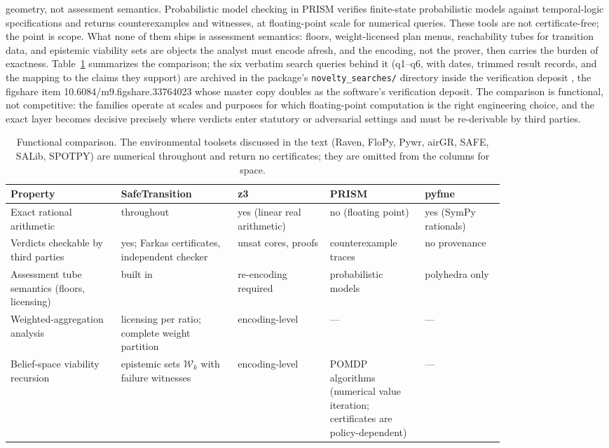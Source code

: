 \documentclass[11pt]{article}
\begin{document}
geometry, not assessment semantics. Probabilistic
model checking in PRISM \citep{Kwiatkowska2011} verifies finite-state
probabilistic models against temporal-logic specifications and returns
counterexamples and witnesses, at floating-point scale for numerical
queries. These tools are not certificate-free; the point is scope. What
none of them ships is
assessment semantics: floors, weight-licensed plan menus, reachability tubes
for transition data, and epistemic viability sets are objects the analyst
must encode afresh, and the encoding, not the prover, then carries the
burden of exactness. Table~\ref{tab:compare} summarizes the comparison; the
six verbatim search queries behind it (q1--q6, with dates, trimmed
result records, and the mapping to the claims they support) are archived
in the package's \texttt{novelty\_searches/} directory inside the
verification deposit \citep{Deposit2026}, the figshare item
10.6084/m9.figshare.33764023 whose master copy doubles as the software's
verification deposit. The comparison is functional, not
competitive: the families operate at scales and purposes for which
floating-point computation is the right engineering choice, and the exact
layer becomes decisive precisely where verdicts enter statutory or
adversarial settings and must be re-derivable by third parties.

\begin{table}[t]
\centering
\small
\setlength{\tabcolsep}{3pt}
\begin{tabular}{@{}p{0.185\linewidth}p{0.19\linewidth}p{0.155\linewidth}p{0.15\linewidth}p{0.135\linewidth}@{}}
\toprule
Property & SafeTransition & z3 & PRISM & pyfme \\
\midrule
Exact rational arithmetic & throughout & yes (linear real arithmetic) & no (floating point) & yes (SymPy rationals) \\
Verdicts checkable by third parties & yes; Farkas certificates, independent checker & unsat cores, proofs & counterexample traces & no provenance \\
Assessment tube semantics (floors, licensing) & built in & re-encoding required & probabilistic models & polyhedra only \\
Weighted-aggregation analysis & licensing per ratio; complete weight partition & encoding-level & --- & --- \\
Belief-space viability recursion & epistemic sets $\mathcal{W}_k$ with failure witnesses & encoding-level & POMDP algorithms (numerical value iteration; certificates are policy-dependent) & --- \\
\bottomrule
\end{tabular}
\caption{Functional comparison. The environmental toolsets discussed in the
text (Raven, FloPy, Pywr, airGR, SAFE, SALib, SPOTPY) are numerical
throughout and return no certificates; they are omitted from the columns
for space.}
\label{tab:compare}
\end{table}
\end{document}
